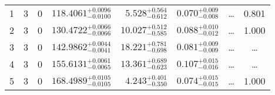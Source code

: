 \begin{table*}[!]
\begin{tabular}{llcrrlrc}
1 & 3 & 0 & $    118.4061_{-      0.0100}^{+      0.0096}$ & $       5.528_{-       0.612}^{+       0.564}$ & $       0.070_{-       0.008}^{+       0.009}$ & \multicolumn{1}{c}{\dots} & 0.801\\[1pt]
2 & 3 & 0 & $    130.4722_{-      0.0066}^{+      0.0066}$ & $      10.027_{-       0.585}^{+       0.512}$ & $       0.088_{-       0.012}^{+       0.010}$ & \multicolumn{1}{c}{\dots} & 1.000\\[1pt]
3 & 3 & 0 & $    142.9862_{-      0.0041}^{+      0.0044}$ & $      18.221_{-       0.698}^{+       0.781}$ & $       0.081_{-       0.009}^{+       0.009}$ & \multicolumn{1}{c}{\dots} & \dots \\[1pt]
4 & 3 & 0 & $    155.6131_{-      0.0065}^{+      0.0061}$ & $      13.361_{-       0.623}^{+       0.689}$ & $       0.107_{-       0.016}^{+       0.015}$ & \multicolumn{1}{c}{\dots} & \dots \\[1pt]
5 & 3 & 0 & $    168.4989_{-      0.0105}^{+      0.0105}$ & $       4.243_{-       0.350}^{+       0.401}$ & $       0.074_{-       0.015}^{+       0.015}$ & \multicolumn{1}{c}{\dots} & 1.000 \\[1pt]
\hline
\end{tabular}
\end{table*}